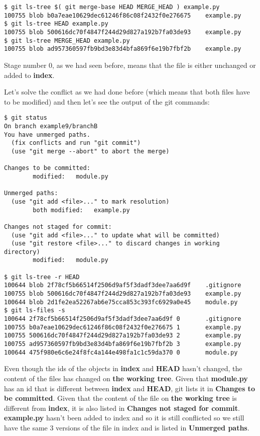 \begin{lstlisting}[style=console_style,
	basicstyle=\small,
	caption=Checking the ids of {\bf example.py} in different revisions]
$ git ls-tree $( git merge-base HEAD MERGE_HEAD ) example.py
100755 blob b0a7eae10629dec61246f86c08f2432f0e276675    example.py
$ git ls-tree HEAD example.py
100755 blob 500616dc70f4847f244d29d827a192b7fa03de93    example.py
$ git ls-tree MERGE_HEAD example.py
100755 blob ad957360597fb9bd3e83d4bfa869f6e19b7fbf2b    example.py
\end{lstlisting}

Stage number 0, as we had seen before, means that the file is either unchanged or added to {\bf index}.

Let's solve the conflict as we had done before (which means that both files have to be modified) and then let's see the
output of the git commands:

\begin{lstlisting}[style=console_style,
	basicstyle=\small,
	caption=Status after modifying the files]
$ git status
On branch example9/branchB
You have unmerged paths.
  (fix conflicts and run "git commit")
  (use "git merge --abort" to abort the merge)

Changes to be committed:
        modified:   module.py

Unmerged paths:
  (use "git add <file>..." to mark resolution)
        both modified:   example.py

Changes not staged for commit:
  (use "git add <file>..." to update what will be committed)
  (use "git restore <file>..." to discard changes in working directory)
        modified:   module.py

$ git ls-tree -r HEAD
100644 blob 2f78cf5b66514f2506d9af5f3dadf3dee7aa6d9f    .gitignore
100755 blob 500616dc70f4847f244d29d827a192b7fa03de93    example.py
100644 blob 2d1fe2ea52267ab6e75cca853c393fc6929a0e45    module.py
$ git ls-files -s
100644 2f78cf5b66514f2506d9af5f3dadf3dee7aa6d9f 0       .gitignore
100755 b0a7eae10629dec61246f86c08f2432f0e276675 1       example.py
100755 500616dc70f4847f244d29d827a192b7fa03de93 2       example.py
100755 ad957360597fb9bd3e83d4bfa869f6e19b7fbf2b 3       example.py
100644 475f980e6c6e24f8fc4a144e498fa1c1c59da370 0       module.py
\end{lstlisting}

Even though the ids of the objects in {\bf index} and {\bf HEAD} hasn't changed, the content of the files has changed on
{\bf the working tree}. Given that {\bf module.py} has an id that is different between {\bf index} and {\bf HEAD}, git lists
it in {\bf Changes to be committed}. Given that the content of the file on {\bf the working tree} is different from {\bf index},
it is also listed in {\bf Changes not staged for commit}. {\bf example.py} hasn't been added to index and so it is still conflicted
so we still have the same 3 versions of the file in index and is listed in {\bf Unmerged paths}.

